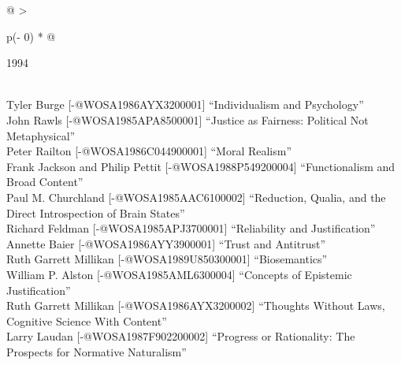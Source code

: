 \documentclass[
  10pt,
  letterpaper,
  DIV=11,
  numbers=noendperiod,
  twoside]{scrartcl}
\begin{document}
\begin{longtable}[]{@{}
  >{\raggedright\arraybackslash}p{(\columnwidth - 0\tabcolsep) * }@{}}

\caption{\label{tbl-top-ten-1985}Most cited articles published less than
ten years ago as of 1994.}

\tabularnewline

\toprule\noalign{}
\begin{minipage}[b]{\linewidth}\raggedright
1994
\end{minipage} \\
\midrule\noalign{}
\endhead
\bottomrule\noalign{}
\endlastfoot
Tyler Burge {[}-@WOSA1986AYX3200001{]} ``Individualism and
Psychology'' \\
John Rawls {[}-@WOSA1985APA8500001{]} ``Justice as Fairness: Political
Not Metaphysical'' \\
Peter Railton {[}-@WOSA1986C044900001{]} ``Moral Realism'' \\
Frank Jackson and Philip Pettit {[}-@WOSA1988P549200004{]}
``Functionalism and Broad Content'' \\
Paul M. Churchland {[}-@WOSA1985AAC6100002{]} ``Reduction, Qualia, and
the Direct Introspection of Brain States'' \\
Richard Feldman {[}-@WOSA1985APJ3700001{]} ``Reliability and
Justification'' \\
Annette Baier {[}-@WOSA1986AYY3900001{]} ``Trust and Antitrust'' \\
Ruth Garrett Millikan {[}-@WOSA1989U850300001{]} ``Biosemantics'' \\
William P. Alston {[}-@WOSA1985AML6300004{]} ``Concepts of Epistemic
Justification'' \\
Ruth Garrett Millikan {[}-@WOSA1986AYX3200002{]} ``Thoughts Without
Laws, Cognitive Science With Content'' \\
Larry Laudan {[}-@WOSA1987F902200002{]} ``Progress or Rationality: The
Prospects for Normative Naturalism'' \\

\end{longtable}
\end{document}
